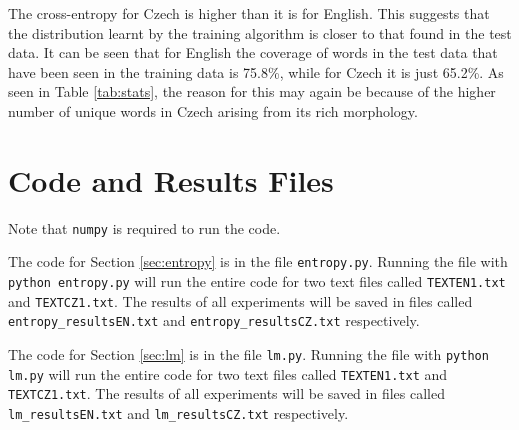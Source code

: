 \documentclass[a4paper]{article}
\begin{document}
The cross-entropy for Czech is higher than it is for English. This suggests that
the distribution learnt by the training algorithm is closer to that found in the
test data. It can be seen that for English the coverage of words in the test
data that have been seen in the training data is 75.8\%, while for Czech it is
just 65.2\%. As seen in Table \ref{tab:stats}, the reason for this may again be
because of the higher number of unique words in Czech arising from its rich
morphology.

\appendix

\section{Code and Results Files}
\label{sec:code}

Note that \texttt{numpy} is required to run the code.

The code for Section \ref{sec:entropy} is in the file \texttt{entropy.py}.
Running the file with \texttt{python entropy.py} will run the entire code for
two text files called \texttt{TEXTEN1.txt} and \texttt{TEXTCZ1.txt}. The results
of all experiments will be saved in files called \texttt{entropy\_resultsEN.txt}
and \texttt{entropy\_resultsCZ.txt} respectively.

The code for Section \ref{sec:lm} is in the file \texttt{lm.py}. Running the
file with \texttt{python lm.py} will run the entire code for two text files
called \texttt{TEXTEN1.txt} and \texttt{TEXTCZ1.txt}. The results of all
experiments will be saved in files called \texttt{lm\_resultsEN.txt} and
\texttt{lm\_resultsCZ.txt} respectively.
\end{document}
